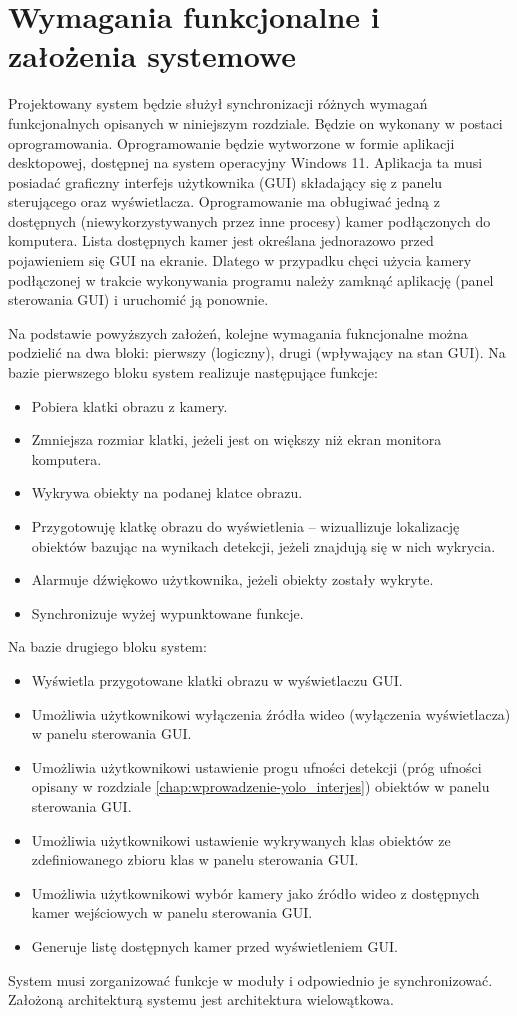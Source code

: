 \section{Wymagania funkcjonalne i założenia systemowe}
\label{chap:wymagania-funcjonalne}
Projektowany system będzie służył synchronizacji różnych wymagań funkcjonalnych opisanych w niniejszym rozdziale. Będzie on wykonany w postaci oprogramowania. 
Oprogramowanie będzie wytworzone w formie aplikacji desktopowej, dostępnej na system operacyjny Windows 11. Aplikacja ta musi posiadać graficzny interfejs użytkownika (GUI) składający się z panelu sterującego oraz wyświetlacza. 
Oprogramowanie ma obługiwać jedną z dostępnych (niewykorzystywanych przez inne procesy) kamer podłączonych do komputera. Lista dostępnych kamer jest określana jednorazowo przed pojawieniem się GUI na ekranie. Dlatego w przypadku chęci użycia kamery podłączonej w trakcie wykonywania programu należy zamknąć aplikację (panel sterowania GUI) i uruchomić ją ponownie.

Na podstawie powyższych założeń, kolejne wymagania fukncjonalne można podzielić na dwa bloki: pierwszy (logiczny), drugi (wpływający na stan GUI). Na bazie pierwszego bloku system realizuje następujące funkcje:
\begin{itemize}
    \item Pobiera klatki obrazu z kamery.
    \item Zmniejsza rozmiar klatki, jeżeli jest on większy niż ekran monitora komputera.
    \item Wykrywa obiekty na podanej klatce obrazu.
    \item Przygotowuję klatkę obrazu do wyświetlenia -- wizuallizuje lokalizację obiektów bazując na wynikach detekcji, jeżeli znajdują się w nich wykrycia.
    \item Alarmuje dźwiękowo użytkownika, jeżeli obiekty zostały wykryte.
    \item Synchronizuje wyżej wypunktowane funkcje.
\end{itemize}

Na bazie drugiego bloku system:
\begin{itemize}
        \item Wyświetla przygotowane klatki obrazu w wyświetlaczu GUI.
        \item Umożliwia użytkownikowi wyłączenia źródła wideo (wyłączenia wyświetlacza) w panelu sterowania GUI.
        \item Umożliwia użytkownikowi ustawienie progu ufności detekcji (próg ufności opisany w rozdziale \ref{chap:wprowadzenie-yolo_interjes}) obiektów w panelu sterowania GUI.
        \item Umożliwia użytkownikowi ustawienie wykrywanych klas obiektów ze zdefiniowanego zbioru klas w panelu sterowania GUI.
        \item Umożliwia użytkownikowi wybór kamery jako źródło wideo z dostępnych kamer wejściowych w panelu sterowania GUI.
        \item Generuje listę dostępnych kamer przed wyświetleniem GUI.
\end{itemize}

System musi zorganizować funkcje w moduły i odpowiednio je synchronizować. Założoną architekturą systemu jest architektura wielowątkowa. 